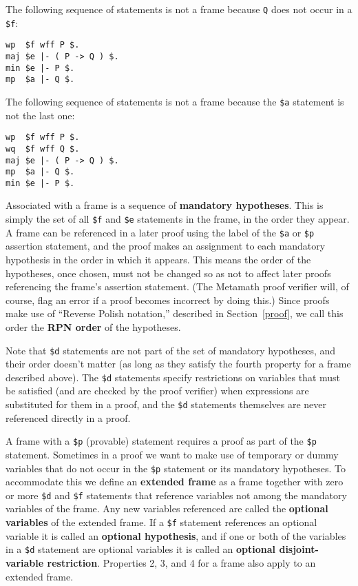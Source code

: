 The following sequence of statements is not a frame because \texttt{Q} does not
occur in a \texttt{\$f}:

\begin{verbatim}
wp  $f wff P $.
maj $e |- ( P -> Q ) $.
min $e |- P $.
mp  $a |- Q $.
\end{verbatim}

The following sequence of statements is not a frame because the \texttt{\$a} statement is
not the last one:

\begin{verbatim}
wp  $f wff P $.
wq  $f wff Q $.
maj $e |- ( P -> Q ) $.
mp  $a |- Q $.
min $e |- P $.
\end{verbatim}

Associated with a frame is a sequence of {\bf mandatory
hypotheses}.  This is simply the set of all
\texttt{\$f} and \texttt{\$e} statements in the frame, in the order they
appear.  A frame can be referenced in a later proof using the label of
the \texttt{\$a} or \texttt{\$p} assertion statement, and the proof
makes an assignment to each mandatory hypothesis in the order in which
it appears.  This means the order of the hypotheses, once chosen, must
not be changed so as not to affect later proofs referencing the frame's
assertion statement.  (The Metamath proof verifier will, of course, flag
an error if a proof becomes incorrect by doing this.)  Since proofs make
use of ``Reverse Polish notation,'' described in Section~\ref{proof}, we
call this order the {\bf RPN order} of the hypotheses.

Note that \texttt{\$d} statements are not part of the set of mandatory
hypotheses, and their order doesn't matter (as long as they satisfy the
fourth property for a frame described above).  The \texttt{\$d}
statements specify restrictions on variables that must be satisfied (and
are checked by the proof verifier) when expressions are substituted for
them in a proof, and the \texttt{\$d} statements themselves are never
referenced directly in a proof.

A frame with a \texttt{\$p} (provable) statement requires a proof as part of the
\texttt{\$p} statement.  Sometimes in a proof we want to make use of temporary or
dummy variables that do not occur in the \texttt{\$p}
statement or its mandatory hypotheses.  To accommodate this we define an {\bf
extended frame} as a frame together with zero or more
\texttt{\$d} and \texttt{\$f} statements that reference variables not among the
mandatory variables of the frame.  Any new variables referenced are called the
{\bf optional variables} of the extended frame. If a
\texttt{\$f} statement references an optional variable it is called an {\bf
optional hypothesis}, and if one or both of the
variables in a \texttt{\$d} statement are optional variables it is called an {\bf
optional disjoint-variable restriction}.  Properties 2, 3, and 4 for a frame also apply to an extended
frame.

